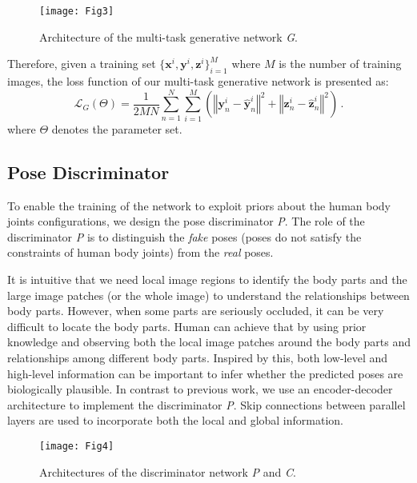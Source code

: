 \documentclass[10pt,letterpaper,twocolumn]{article}
\begin{document}
\begin{figure*}[!t]
\centering
\texttt{[image: Fig3]}
\caption{Architecture of the multi-task generative network \textit{G}.}
\label{fig:Architecture-of-G}
\end{figure*}

Therefore, given a training set $\{\bm{x}^{i},\bm{y}^{i},\bm{z}^{i}\}_{i=1}^{M}$ where $M$ is the number of training images, the loss function of our multi-task generative network is presented as:
\begin{equation}
\label{eq:multitaskG}
\mathcal{L}_{G}(\Theta)=\frac{1}{2MN}\sum_{n=1}^{N}\sum_{i=1}^{M}\left(\left\Vert \bm{y}_{n}^{i}-\hat{\bm{y}}_{n}^{i}\right\Vert ^{2}+\left\Vert \bm{z}_{n}^{i}-\hat{\bm{z}}_{n}^{i}\right\Vert ^{2}\right) \,.
\end{equation}
where $\Theta$ denotes the parameter set.


\subsection{Pose Discriminator}\label{subsec:Pose-Discriminator}

To enable the training of the network to exploit priors about the human body joints configurations, we design the pose discriminator \textit{P}. The role of the discriminator \emph{P} is to distinguish the {\it fake} poses (poses do not satisfy the constraints of human body joints) from the {\it real} poses.

It is intuitive that we need local image regions to identify the body parts and the large image patches (or the whole image) to understand the relationships between body parts. However, when some parts are seriously occluded, it can  be very difficult  to locate the body parts. Human can achieve that by  using
prior knowledge and observing both the local image patches around the body parts and relationships among different body parts. Inspired by this, both low-level and high-level information can be important to infer whether the predicted poses are biologically plausible. In contrast to previous work, we use an encoder-decoder architecture to implement the discriminator \emph{P}. Skip connections between parallel layers are used to incorporate both the local and global information.

\begin{figure*}[!t]
\centering
\texttt{[image: Fig4]}
\caption{Architectures of the discriminator network \textit{P} and \textit{C}.}
\label{fig:Architectures-of-P}
\end{figure*}
\end{document}
